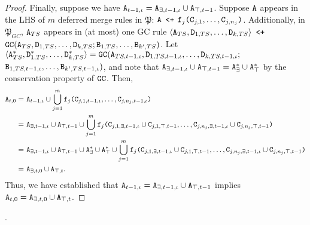 \begin{proof}
Finally, suppose we have $\tt{A}_{t-1,\iota} = \tt{A}_{\exists,t-1,\iota} \cup \tt{A}_{\top,t-1}$.
Suppose $\tt{A}$ appears in the LHS of $m$ deferred merge rules in $\mathfrak{P}$: $\tt{A}$ $\tt{<+}$ $\tt{f}_j\tt{(}\tt{C}_{j,1},\dots,\tt{C}_{j,n_j}\tt{)}$.
Additionally, in $\mathfrak{P}_{GC}$, $\tt{A}_{TS}$ appears in (at most) one GC rule $\langle \tt{A}_{TS}, \tt{D}_{1,TS}, \dots, \tt{D}_{k,TS} \rangle$ $\tt{<+}$ $\tt{GC}(\tt{A}_{TS}, \tt{D}_{1,TS}, \dots, \tt{D}_{k,TS}; \tt{B}_{1,TS}, \dots, \tt{B}_{k',TS})$.
Let $\langle \tt{A}_{TS}^*, \tt{D}_{1,TS}^*, \dots, \tt{D}_{k,TS}^* \rangle = \tt{GC}(\tt{A}_{TS,t-1,\iota}, \tt{D}_{1,TS,t-1,\iota}, \dots, \tt{D}_{k,TS,t-1,\iota};$ $\tt{B}_{1,TS,t-1,\iota}, \dots, \tt{B}_{k',TS,t-1,\iota})$, and note that $\tt{A}_{\exists,t-1,\iota} \cup \tt{A}_{\top,t-1} = \tt{A}_{\exists}^* \cup \tt{A}_{\top}^*$ by the conservation property of $\tt{GC}$.
Then,
\begin{align*}
\tt{A}_{t,0}
=~& \tt{A}_{t-1,\iota} \cup \bigcup_{j=1}^m \tt{f}_j\tt{(}\tt{C}_{j,1,t-1,\iota},\dots,\tt{C}_{j,n_j,t-1,\iota}\tt{)}\\
=~& \tt{A}_{\exists,t-1,\iota} \cup \tt{A}_{\top,t-1}
\cup \bigcup_{j=1}^m \tt{f}_j\tt{(}\tt{C}_{j,1,\exists,t-1,\iota} \cup \tt{C}_{j,1,\top,t-1}, \dots, \tt{C}_{j,n_j,\exists,t-1,\iota} \cup \tt{C}_{j,n_j,\top,t-1}\tt{)}\\
=~& \tt{A}_{\exists,t-1,\iota} \cup \tt{A}_{\top,t-1}
\cup \tt{A}_{\exists}^* \cup \tt{A}_{\top}^*
\cup \bigcup_{j=1}^m \tt{f}_j\tt{(}\tt{C}_{j,1,\exists,t-1,\iota} \cup \tt{C}_{j,1,\top,t-1}, \dots, \tt{C}_{j,n_j,\exists,t-1,\iota} \cup \tt{C}_{j,n_j,\top,t-1}\tt{)}\\
=~& \tt{A}_{\exists,t,0} \cup \tt{A}_{\top,t}.
\end{align*}
Thus, we have established that $\tt{A}_{t-1,\iota} = \tt{A}_{\exists,t-1,\iota} \cup \tt{A}_{\top,t-1}$ implies $\tt{A}_{t,0} = \tt{A}_{\exists,t,0} \cup \tt{A}_{\top,t}$.
\end{proof}



.

